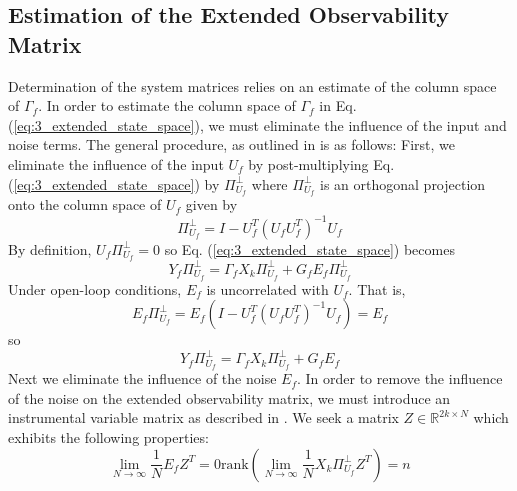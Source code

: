 \subsection{Estimation of the Extended Observability Matrix}\label{sec:estimation_of_the_extended_observability_matrix}
Determination of the system matrices relies on an estimate of the column space of $\Gamma_f$. In order to estimate the column space of $\Gamma_f$ in Eq. (\ref{eq:3_extended_state_space}), we must eliminate the influence of the input and noise terms. The general procedure, as outlined in \cite{qin2006overview, verhaegen2007filtering} is as follows: First, we eliminate the influence of the input $U_f$ by post-multiplying Eq. (\ref{eq:3_extended_state_space}) by $\Pi_{U_f}^\perp$ where $\Pi_{U_f}^\perp$ is an orthogonal projection onto the column space of $U_f$ given by
\begin{equation*}
\Pi_{U_f}^\perp = I - U_f^T(U_f U_f^T)^{-1}U_f
\end{equation*}
By definition, $U_f\Pi_{U_f}^\perp = 0$ so Eq. (\ref{eq:3_extended_state_space}) becomes
\begin{equation}
Y_f\Pi_{U_f}^\perp = \Gamma_f X_k\Pi_{U_f}^\perp + G_f E_f\Pi_{U_f}^\perp
\end{equation}
Under open-loop conditions, $E_f$ is uncorrelated with $U_f$. That is,
\begin{equation*}
E_f \Pi_{U_f}^\perp = E_f(I-U_f^T(U_fU_f^T)^{-1}U_f) = E_f
\end{equation*}
so
\begin{equation}\label{eq:3_extended_state_space_noinput}
Y_f\Pi_{U_f}^\perp = \Gamma_f X_k\Pi_{U_f}^\perp + G_f E_f
\end{equation}
Next we eliminate the influence of the noise $E_f$. In order to remove the influence of the noise on the extended observability matrix, we must introduce an instrumental variable matrix as described in \cite{verhaegen2007filtering}. We seek a matrix $Z \in \mathbb{R}^{2k\times N}$ which exhibits the following properties:
\begin{subequations}\begin{equation}\label{eq:3_instrumental_a}
\lim_{N\rightarrow\infty} \frac{1}{N} E_f Z^T = 0
\end{equation}
\begin{equation}\label{eq:3_instrumental_b}
\mbox{rank}\left(\lim_{N\rightarrow\infty} \frac{1}{N} X_k \Pi_{U_f}^\perp Z^T\right) = n
\end{equation}
\end{subequations}
